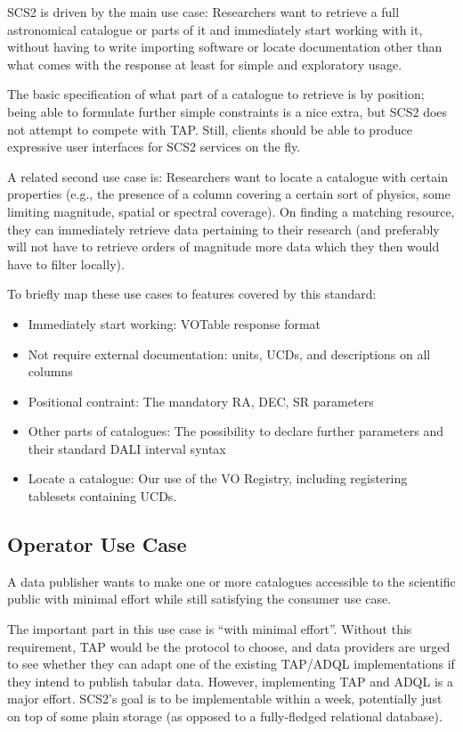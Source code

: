 \documentclass[11pt,a4paper]{ivoa}
\begin{document}
SCS2 is driven by the main use case: Researchers want to retrieve a
full astronomical catalogue or parts of it and immediately start working
with it, without having to write importing software or locate
documentation other than what comes with the response at least for
simple and exploratory usage.

The basic specification of what part of a
catalogue to retrieve is by position; being able to
formulate further simple constraints is a nice extra, but SCS2 does not
attempt to compete with TAP.  Still, clients should be able to produce
expressive user interfaces for SCS2 services on the fly.

A related second use case is: Researchers want to locate a catalogue
with certain properties (e.g., the presence of a column covering a
certain sort of physics, some limiting magnitude, spatial or spectral
coverage).  On finding a matching resource, they can immediately
retrieve
data pertaining to their research (and preferably will not have to
retrieve orders of magnitude more data which they then would have to
filter locally).

To briefly map these use cases to features covered by this standard:

\begin{itemize}
\item Immediately start working: VOTable response format
\item Not require external documentation: units, UCDs, and descriptions
on all columns
\item Positional contraint: The mandatory RA, DEC, SR parameters
\item Other parts of catalogues: The possibility to declare further
parameters and their standard DALI interval syntax
\item Locate a catalogue: Our use of the VO Registry, including
registering tablesets containing UCDs.
\end{itemize}


\subsection{Operator Use Case}

A data publisher wants to make one or more catalogues accessible to the
scientific public with minimal effort while still satisfying the
consumer use case.

The important part in this use case is ``with minimal effort''.
Without this requirement, TAP would be the protocol to choose, and data
providers are urged to see whether they can adapt one of the existing
TAP/ADQL implementations if they intend to publish tabular data.
However, implementing TAP and ADQL is a major
effort.  SCS2's goal is to be implementable within a week, potentially
just on top of some plain storage (as opposed to a fully-fledged
relational database).
\end{document}
